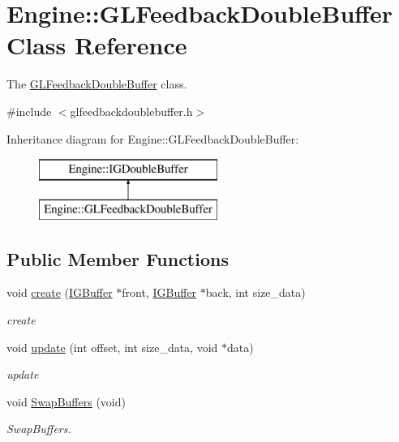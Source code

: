 \hypertarget{classEngine_1_1GLFeedbackDoubleBuffer}{}\section{Engine\+:\+:G\+L\+Feedback\+Double\+Buffer Class Reference}
\label{classEngine_1_1GLFeedbackDoubleBuffer}


The \hyperlink{classEngine_1_1GLFeedbackDoubleBuffer}{G\+L\+Feedback\+Double\+Buffer} class.  




{\ttfamily \#include $<$glfeedbackdoublebuffer.\+h$>$}

Inheritance diagram for Engine\+:\+:G\+L\+Feedback\+Double\+Buffer\+:\begin{figure}[H]
\begin{center}
\leavevmode
\includegraphics[height=2.000000cm]{classEngine_1_1GLFeedbackDoubleBuffer}
\end{center}
\end{figure}
\subsection*{Public Member Functions}
\begin{DoxyCompactItemize}
\item 
void \hyperlink{classEngine_1_1GLFeedbackDoubleBuffer_a093faa032cd6f229c6a0e6b18fca11b6}{create} (\hyperlink{classEngine_1_1IGBuffer}{I\+G\+Buffer} $\ast$front, \hyperlink{classEngine_1_1IGBuffer}{I\+G\+Buffer} $\ast$back, int size\+\_\+data)
\begin{DoxyCompactList}\small\item\em create \end{DoxyCompactList}\item 
void \hyperlink{classEngine_1_1GLFeedbackDoubleBuffer_a94805048c8b23cb2bf83d40ace22c9cd}{update} (int offset, int size\+\_\+data, void $\ast$data)
\begin{DoxyCompactList}\small\item\em update \end{DoxyCompactList}\item 
void \hyperlink{classEngine_1_1GLFeedbackDoubleBuffer_aee224416eeeaa26f4c1eb0158cde1f68}{Swap\+Buffers} (void)
\begin{DoxyCompactList}\small\item\em Swap\+Buffers. \end{DoxyCompactList}\end{DoxyCompactItemize}
